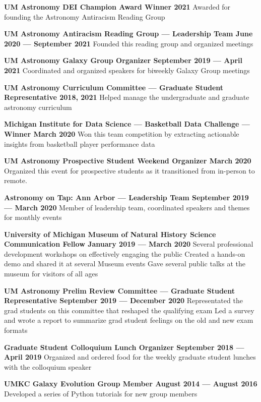 \documentclass[10pt]{article}
\newcommand{\actionHeader}[2]{\textbf{#1 \hfill #2}}
\newcommand{\indentedItem}[1]{\newline\null\qquad #1}
\begin{document}
\actionHeader{UM Astronomy DEI Champion Award Winner}{2021}
\indentedItem{Awarded for founding the Astronomy Antiracism Reading Group}

\actionHeader{UM Astronomy Antiracism Reading Group --- Leadership Team}{June 2020 --- September 2021}
\indentedItem{Founded this reading group and organized meetings}

\actionHeader{UM Astronomy Galaxy Group Organizer}{September 2019 --- April 2021}
\indentedItem{Coordinated and organized speakers for biweekly Galaxy Group meetings}

\actionHeader{UM Astronomy Curriculum Committee --- Graduate Student Representative}{2018, 2021}
\indentedItem{Helped manage the undergraduate and graduate astronomy curriculum}

\actionHeader{Michigan Institute for Data Science --- Basketball Data Challenge --- Winner}{March 2020}
\indentedItem{Won this team competition by extracting actionable insights from basketball player performance data}

\actionHeader{UM Astronomy Prospective Student Weekend Organizer}{March 2020}
\indentedItem{Organized this event for prospective students as it transitioned from in-person to remote.}

\actionHeader{Astronomy on Tap: Ann Arbor --- Leadership Team}{September 2019 --- March 2020}
\indentedItem{Member of leadership team, coordinated speakers and themes for monthly events}

\actionHeader{University of Michigan Museum of Natural History Science Communication Fellow}{January 2019 --- March 2020}
\indentedItem{Several professional development workshops on effectively engaging the public}
\indentedItem{Created a hands-on demo and shared it at several Museum events}
\indentedItem{Gave several public talks at the museum for visitors of all ages}

\actionHeader{UM Astronomy Prelim Review Committee --- Graduate Student Representative}{September 2019 --- December 2020}
\indentedItem{Representated the grad students on this committee that reshaped the qualifying exam}
\indentedItem{Led a survey and wrote a report to summarize grad student feelings on the old and new exam formats}

\actionHeader{Graduate Student Colloquium Lunch Organizer}{September 2018 --- April 2019}
\indentedItem{Organized and ordered food for the weekly graduate student lunches with the colloquium speaker}

\actionHeader{UMKC Galaxy Evolution Group Member}{August 2014 --- August 2016}
\indentedItem{Developed a series of Python tutorials for new group members}
\end{document}
